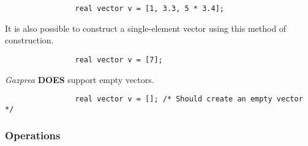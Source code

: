 \documentclass[../../gazprea.tex]{subfiles}
\begin{document}
			\begin{lstlisting}
				real vector v = [1, 3.3, 5 * 3.4];
			\end{lstlisting}

			It is also possible to construct a single-element vector using this method of construction.

			\begin{lstlisting}
				real vector v = [7];
			\end{lstlisting}

			\textit{Gazprea} \textbf{DOES} support empty vectors.

			\begin{lstlisting}
				real vector v = []; /* Should create an empty vector */
			\end{lstlisting}

		\subsubsection{Operations}
\end{document}
